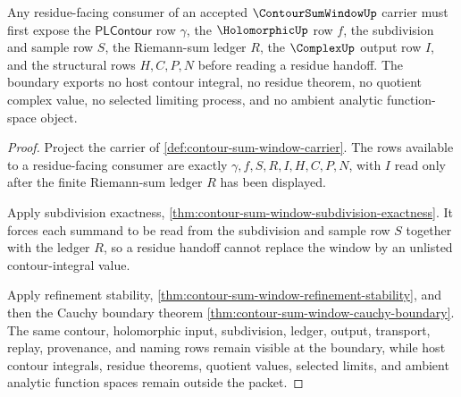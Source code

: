 \begin{theorem}
\label{thm:contour-sum-window-residue-boundary}
Any residue-facing consumer of an accepted $\ContourSumWindowUp$ carrier must first expose the $\mathsf{PLContour}$ row $\gamma$, the $\HolomorphicUp$ row $f$, the subdivision and sample row $S$, the Riemann-sum ledger $R$, the $\ComplexUp$ output row $I$, and the structural rows $H,C,P,N$ before reading a residue handoff. The boundary exports no host contour integral, no residue theorem, no quotient complex value, no selected limiting process, and no ambient analytic function-space object.
\end{theorem}
\begin{proof}
Project the carrier of \autoref{def:contour-sum-window-carrier}. The rows available to a residue-facing consumer are exactly $\gamma,f,S,R,I,H,C,P,N$, with $I$ read only after the finite Riemann-sum ledger $R$ has been displayed.

Apply subdivision exactness, \autoref{thm:contour-sum-window-subdivision-exactness}. It forces each summand to be read from the subdivision and sample row $S$ together with the ledger $R$, so a residue handoff cannot replace the window by an unlisted contour-integral value.

Apply refinement stability, \autoref{thm:contour-sum-window-refinement-stability}, and then the Cauchy boundary theorem \autoref{thm:contour-sum-window-cauchy-boundary}. The same contour, holomorphic input, subdivision, ledger, output, transport, replay, provenance, and naming rows remain visible at the boundary, while host contour integrals, residue theorems, quotient values, selected limits, and ambient analytic function spaces remain outside the packet.
\end{proof}

